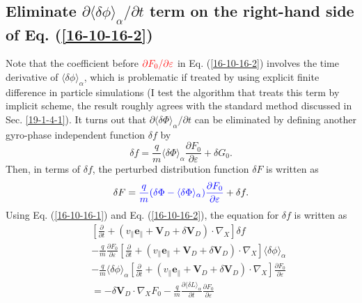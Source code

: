 \documentclass{article}
\newcommand{\tmcolor}[2]{{\color{#1}{#2}}}
\begin{document}
\subsection{Eliminate $\partial \langle \delta \phi \rangle_{\alpha} /
\partial t$ term on the right-hand side of Eq. (\ref{16-10-16-2})}

Note that the coefficient before $\tmcolor{red}{\partial F_0 / \partial
\varepsilon}$ in Eq. (\ref{16-10-16-2}) involves the time derivative of
$\langle \delta \phi \rangle_{\alpha}$, which is problematic if treated by
using explicit finite difference in particle simulations (I test the algorithm
that treats this term by implicit scheme, the result roughly agrees with the
standard method discussed in Sec. \ref{19-1-4-1}). It turns out that $\partial
\langle \delta \Phi \rangle_{\alpha} / \partial t$ can be eliminated by
defining another gyro-phase independent function $\delta f$ by
\begin{equation}
  \label{16-10-16-1} \delta f = \frac{q}{m} \langle \delta \Phi
  \rangle_{\alpha} \frac{\partial F_0}{\partial \varepsilon} + \delta G_0 .
\end{equation}
Then, in terms of $\delta f$, the perturbed distribution function $\delta F$
is written as
\begin{equation}
  \label{17-8-19-2} \delta F = \tmcolor{blue}{\frac{q}{m} (\delta \Phi -
  \langle \delta \Phi \rangle_{\alpha}) \frac{\partial F_0}{\partial
  \varepsilon}} + \delta f.
\end{equation}
Using Eq. (\ref{16-10-16-1}) and Eq. (\ref{16-10-16-2}), the equation for
$\delta f$ is written as
\begin{eqnarray}
  &  & \left[ \frac{\partial}{\partial t} + (v_{\parallel}
  \mathbf{e}_{\parallel} +\mathbf{V}_D + \delta \mathbf{V}_D) \cdot \nabla_X
  \right] \delta f \nonumber\\
  &  & - \frac{q}{m}  \frac{\partial F_0}{\partial \varepsilon} \left[
  \frac{\partial}{\partial t} + (v_{\parallel} \mathbf{e}_{\parallel}
  +\mathbf{V}_D + \delta \mathbf{V}_D) \cdot \nabla_X \right] \langle \delta
  \phi \rangle_{\alpha} \nonumber\\
  &  & - \frac{q}{m}  \langle \delta \phi \rangle_{\alpha} \left[
  \frac{\partial}{\partial t} + (v_{\parallel} \mathbf{e}_{\parallel}
  +\mathbf{V}_D + \delta \mathbf{V}_D) \cdot \nabla_X \right] \frac{\partial
  F_0}{\partial \varepsilon} \nonumber\\
  &  & = - \delta \mathbf{V}_D \cdot \nabla_X F_0 - \frac{q}{m} 
  \frac{\partial \langle \delta L \rangle_{\alpha}}{\partial t} 
  \frac{\partial F_0}{\partial \varepsilon} 
\end{eqnarray}
\end{document}
